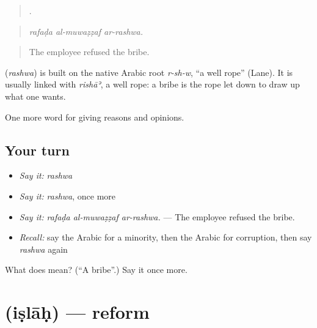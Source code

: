 \begin{quote}
  .
\end{quote}

\begin{quote}
\emph{rafaḍa al-muwaẓẓaf ar-rashwa.}
\end{quote}

\begin{quote}
The employee refused the bribe.
\end{quote}

\begin{cousinweb}
\textbf{} (\emph{rashwa}) is built on the native Arabic root \emph{r-sh-w}, \textquotedblleft{}a well rope\textquotedblright{} (Lane). It is usually linked with \emph{rishāʾ}, a well rope: a bribe is the rope let down to draw up what one wants.
\end{cousinweb}

\begin{grammarlens}[title={What you've built}]
One more word for giving reasons and opinions.
\end{grammarlens}

\subsection*{Your turn}
\begin{itemize}
\raggedright
  \item \emph{Say it:} \emph{rashwa}
  \item \emph{Say it:} \emph{rashwa}, once more
  \item \emph{Say it:} \emph{rafaḍa al-muwaẓẓaf ar-rashwa.} — The employee refused the bribe.
  \item \emph{Recall:} say the Arabic for a minority, then the Arabic for corruption, then say \emph{rashwa} again
\end{itemize}

\begin{tcolorbox}[breakable,colback=teal!4,colframe=teal!35!black,title={Before you move on}]
What does  mean? (\textquotedblleft{}A bribe\textquotedblright{}.) Say it once more.
\end{tcolorbox}
\section[\texorpdfstring{\ar{إصلاح} (iṣlāḥ)}{إصلاح (iṣlāḥ)}]{ (iṣlāḥ) — reform}

\label{lesson:AR-C388-islah}



